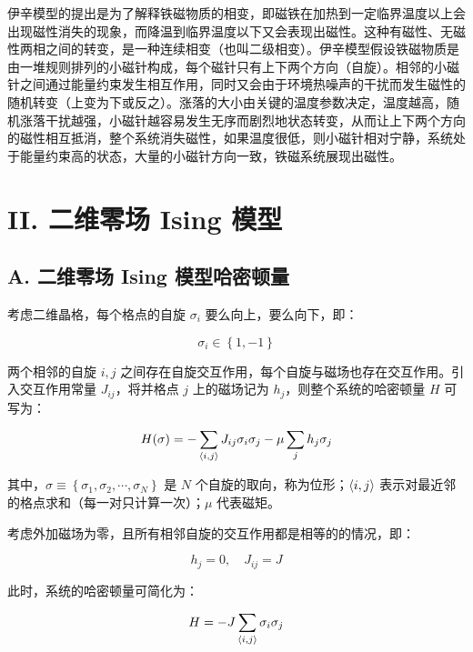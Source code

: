 \documentclass[aps,prl,twocolumn,groupedaddress]{revtex4-2}
\begin{document}
伊辛模型\cite{03}的提出是为了解释铁磁物质的相变，即磁铁在加热到一定临界温度以上会出现磁性消失的现象，而降温到临界温度以下又会表现出磁性。这种有磁性、无磁性两相之间的转变，是一种连续相变（也叫二级相变）。伊辛模型假设铁磁物质是由一堆规则排列的小磁针构成，每个磁针只有上下两个方向（自旋）。相邻的小磁针之间通过能量约束发生相互作用，同时又会由于环境热噪声的干扰而发生磁性的随机转变（上变为下或反之）。涨落的大小由关键的温度参数决定，温度越高，随机涨落干扰越强，小磁针越容易发生无序而剧烈地状态转变，从而让上下两个方向的磁性相互抵消，整个系统消失磁性，如果温度很低，则小磁针相对宁静，系统处于能量约束高的状态，大量的小磁针方向一致，铁磁系统展现出磁性。

\section{II. 二维零场 Ising 模型}

\subsection{A. 二维零场 Ising 模型哈密顿量}

考虑二维晶格，每个格点的自旋 $\sigma_i $ 要么向上，要么向下，即：

$$
\sigma_i \in \left\{1,-1 \right\}
$$

两个相邻的自旋 $i,j $ 之间存在自旋交互作用，每个自旋与磁场也存在交互作用。引入交互作用常量 $J_{ij} $，将并格点 $j $ 上的磁场记为 $h_j $，则整个系统的哈密顿量 $H $ 可写为：

$$
H(\sigma)
=-\sum_{\braket{i,j}} J_{ij} \sigma_i \sigma_j - \mu \sum_{j} h_j \sigma_j
$$

其中，$\sigma\equiv \left\{\sigma_1,\sigma_2,\cdots,\sigma_N \right\} $ 是 $N $ 个自旋的取向，称为位形；$\braket{i,j} $ 表示对最近邻的格点求和（每一对只计算一次）；$\mu $ 代表磁矩。

考虑外加磁场为零，且所有相邻自旋的交互作用都是相等的的情况，即：

$$
h_j = 0,\quad 
J_{ij} = J
$$

此时，系统的哈密顿量可简化为：

$$
H
=-J \sum_{\braket{i,j}} \sigma_i\sigma_j
$$
\end{document}

